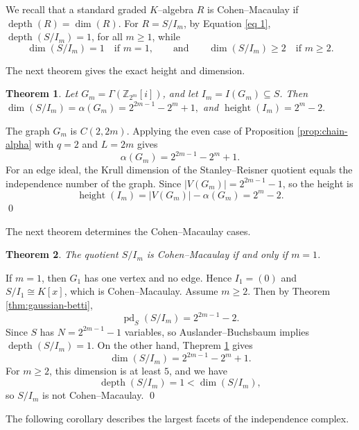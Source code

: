 \documentclass[12pt]{article}
\newtheorem{theorem}{Theorem}[section]
\theoremstyle{definition}
\renewenvironment{proof}{{\bf \noindent Proof.}}{\qed}
\begin{document}
We recall that a standard graded $K$–algebra $R$ is Cohen--Macaulay if $\operatorname{depth}(R)=\dim(R).$ For $R=S/I_m$, by Equation \eqref{eq 1}, $\operatorname{depth}(S/I_m)=1$, for all
$m\ge1$, while
\[
\dim(S/I_m)=1 \quad\text{if } m=1,\qquad\text{and}\qquad
\dim(S/I_m)\ge2 \quad\text{if } m\ge2.
\]

The next theorem gives the exact height and dimension.

\medskip

\begin{theorem}\label{thm:gaussian-dim-height}
	Let $G_m=\Gamma(\mathbb{Z}_{2^m}[i])$, and let $I_m=I(G_m)\subseteq S$.  Then
	$ \dim(S/I_m)=\alpha(G_m)=2^{2m-1}-2^m+1, $
	and
	$ \operatorname{height}(I_m)=2^m-2. $
\end{theorem}

\begin{proof}
	The graph $G_m$ is $C(2,2m)$.  Applying the even case of Proposition \ref{prop:chain-alpha} with $q=2$ and $L=2m$ gives
	$$
	\alpha(G_m)=2^{2m-1}-2^m+1.
	$$
	For an edge ideal, the Krull dimension of the Stanley--Reisner quotient equals the independence number of the graph.  Since $|V(G_m)|=2^{2m-1}-1$, so the height is
	$$
	\operatorname{height}(I_m)=|V(G_m)|-\alpha(G_m)=2^m-2.
	$$
\end{proof}

\medskip

The next theorem determines the Cohen--Macaulay cases.

\medskip

\begin{theorem}\label{thm:gaussian-CM}
	The quotient $S/I_m$ is Cohen--Macaulay if and only if $m=1$.
\end{theorem}

\begin{proof}
	If $m=1$, then $G_1$ has one vertex and no edge.  Hence $I_1=(0)$ and $S/I_1\cong K[x]$, which is Cohen--Macaulay.
	 Assume $m\geq 2$. Then by Theorem \ref{thm:gaussian-betti},
	$$
	\operatorname{pd}_S(S/I_m)=2^{2m-1}-2.
	$$
	Since $S$ has $N=2^{2m-1}-1$ variables, so Auslander--Buchsbaum implies
	$ \operatorname{depth}(S/I_m)=1. $
	On the other hand, Theprem \ref{thm:gaussian-dim-height} gives
	$$
	\dim(S/I_m)=2^{2m-1}-2^m+1.
	$$
	For $m\geq 2$, this dimension is at least $5$, and we have
	$$
	\operatorname{depth}(S/I_m)=1<\dim(S/I_m),
	$$
	so $S/I_m$ is not Cohen--Macaulay.
\end{proof}

\medskip

The following corollary describes the largest facets of the independence complex.
\end{document}
